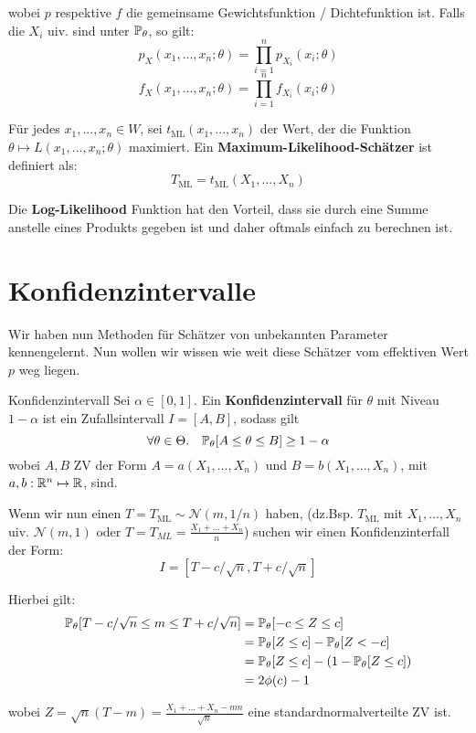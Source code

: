 wobei $p$ respektive $f$ die gemeinsame Gewichtsfunktion / Dichtefunktion ist. Falls die $X_i$ uiv. sind unter $\mathbb{P}_\theta$, so gilt:
$$p_X(x_1,...,x_n;\theta) = \prod_{i=1}^n p_{X_i}(x_i; \theta)$$ $$f_X(x_1,...,x_n;\theta) = \prod_{i=1}^n f_{X_i}(x_i; \theta)$$

Für jedes $x_1, ..., x_n \in W$, sei $t_{\text{ML}}(x_1, ..., x_n)$ der Wert, der die Funktion $\theta \mapsto L(x_1, ..., x_n; \theta)$ maximiert. Ein \textbf{Maximum-Likelihood-Schätzer} ist definiert als: 
$$T_{\text{ML}} = t_{\text{ML}}(X_1,...,X_n)$$

Die \textbf{Log-Likelihood} Funktion hat den Vorteil, dass sie durch eine Summe anstelle eines Produkts gegeben ist und daher oftmals einfach zu berechnen ist.


\section*{Konfidenzintervalle}

Wir haben nun Methoden für Schätzer von unbekannten Parameter kennengelernt. Nun wollen wir wissen wie weit diese Schätzer vom effektiven Wert $p$ weg liegen.

\begin{mainbox}{Konfidenzintervall}
    Sei $\alpha \in [0,1]$. Ein \textbf{Konfidenzintervall} für $\theta$ mit Niveau $1 - \alpha$ ist ein Zufallsintervall $I = [A, B]$, sodass gilt 
    $$\forall \theta \in \Theta. \quad \mathbb{P}_\theta[A \leq \theta \leq B] \geq 1 - \alpha$$
    wobei $A,B$ ZV der Form $A = a (X_1, ..., X_n)$ und $B = b (X_1, ..., X_n)$, mit $a,b : \mathbb{R}^n \mapsto \mathbb{R}$, sind.
\end{mainbox}

Wenn wir nun einen $T = T_{\text{ML}} \sim \mathcal{N}(m, 1/n)$ haben, (dz.Bsp. $T_{\text{ML}}$ mit $X_1,...,X_n$ uiv. $\mathcal{N}(m, 1)$ oder $T = T_{ML} = \frac{X_1 + \ldots + X_n}{n}$) suchen wir einen Konfidenzinterfall der Form: 
$$I = [T - c/\sqrt{n}, T + c / \sqrt{n}]$$

Hierbei gilt:
\begin{align*}\mathbb{P}_\theta[T - c/\sqrt{n} \leq m \leq T + c/\sqrt{n}] &= \mathbb{P}_\theta[-c \leq Z \leq c] \\ &= \mathbb{P}_\theta[Z \leq c] - \mathbb{P}_\theta[Z < -c] \\ &= \mathbb{P}_\theta[Z \leq c] - (1 - \mathbb{P}_\theta[Z \leq c]) \\ &= 2\phi(c) - 1\end{align*}

wobei $Z = \sqrt{n}(T-m) =  \frac{X_1 + \ldots + X_n - mn}{\sqrt{n}}$ eine standardnormalverteilte ZV ist.

